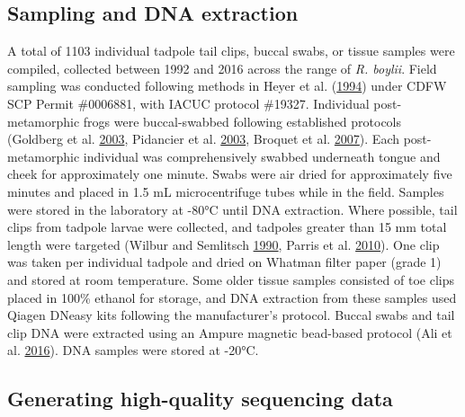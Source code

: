 \documentclass[proquest,12pt,final]{ucthesis-CA2012} %
\begin{document}
\begin{ucmainmatter}
\hypertarget{sampling-and-dna-extraction}{%
\subsection{Sampling and DNA
extraction}\label{sampling-and-dna-extraction}}

A total of 1103 individual tadpole tail clips, buccal swabs, or tissue
samples were compiled, collected between 1992 and 2016 across the range
of \emph{R. boylii}. Field sampling was conducted following methods in
Heyer et al. (\protect\hyperlink{ref-heyer_measuring_1994}{1994}) under
CDFW SCP Permit \#0006881, with IACUC protocol \#19327. Individual
post-metamorphic frogs were buccal-swabbed following established
protocols (Goldberg et al.
\protect\hyperlink{ref-goldberg_frogs_2003}{2003}, Pidancier et al.
\protect\hyperlink{ref-pidancier_buccal_2003}{2003}, Broquet et al.
\protect\hyperlink{ref-broquet_buccal_2007}{2007}). Each
post-metamorphic individual was comprehensively swabbed underneath
tongue and cheek for approximately one minute. Swabs were air dried for
approximately five minutes and placed in 1.5 mL microcentrifuge tubes
while in the field. Samples were stored in the laboratory at -80°C until
DNA extraction. Where possible, tail clips from tadpole larvae were
collected, and tadpoles greater than 15 mm total length were targeted
(Wilbur and Semlitsch
\protect\hyperlink{ref-wilbur_ecological_1990}{1990}, Parris et al.
\protect\hyperlink{ref-parris_assessing_2010}{2010}). One clip was taken
per individual tadpole and dried on Whatman filter paper (grade 1) and
stored at room temperature. Some older tissue samples consisted of toe
clips placed in 100\% ethanol for storage, and DNA extraction from these
samples used Qiagen DNeasy kits following the manufacturer's protocol.
Buccal swabs and tail clip DNA were extracted using an Ampure magnetic
bead-based protocol (Ali et al.
\protect\hyperlink{ref-ali_rad_2016}{2016}). DNA samples were stored at
-20°C.

\hypertarget{generating-high-quality-sequencing-data}{%
\subsection{Generating high-quality sequencing
data}\label{generating-high-quality-sequencing-data}}


\end{ucmainmatter}
\end{document}
